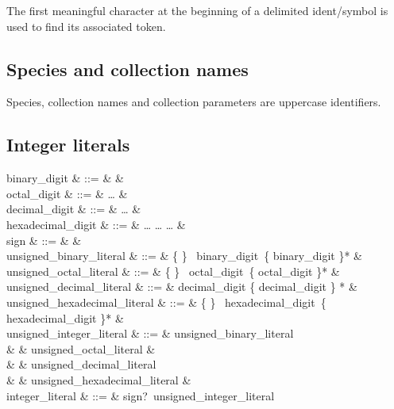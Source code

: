 The first meaningful character at the beginning of a delimited
ident/symbol is used to find its associated token.

\subsection{Species and collection names}
 Species, collection
names and collection parameters are uppercase identifiers.

\subsection{Integer literals}
\label{integer literals}
\label{octal}
\label{hexadecimal}
\label{binary}

\begin{syntax}
binary\_digit & ::= &  \mid {} & \\
octal\_digit & ::= &  \ldots {} & \\
decimal\_digit & ::= &  \ldots {} & \\
hexadecimal\_digit & ::= &  \ldots {}
       \mid {} \ldots {}
       \mid {} \ldots {} & \\
sign & ::= & \terminal{+} \mid \terminal{-} & \\
unsigned\_binary\_literal & ::= &
   \{  \mid {} \}
  \ binary\_digit\ \{ binary\_digit \mid \terminal{\_} \}* & \\
unsigned\_octal\_literal & ::= &
   \{  \mid {} \}
  \ octal\_digit\ \{ octal\_digit \mid \terminal{\_} \}* & \\
unsigned\_decimal\_literal & ::= &
  decimal\_digit \{ decimal\_digit \mid \terminal{\_} \} * & \\
unsigned\_hexadecimal\_literal & ::= &
   \{  \mid {} \}
  \ hexadecimal\_digit\ \{ hexadecimal\_digit \mid \terminal{\_} \}* & \\
unsigned\_integer\_literal & ::= & unsigned\_binary\_literal \\
& & \mid unsigned\_octal\_literal & \\
& & \mid unsigned\_decimal\_literal \\
& & \mid unsigned\_hexadecimal\_literal & \\
integer\_literal & ::= & sign?\ unsigned\_integer\_literal
\end{syntax}

